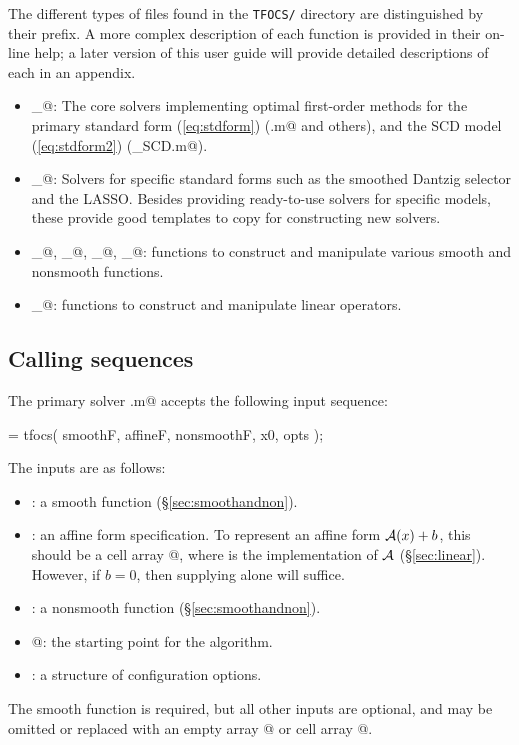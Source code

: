 \documentclass{article}
\begin{document}
The different types of files found in the \verb+TFOCS/+ directory are
distinguished by their prefix. A more complex description of each 
function is provided in their on-line help; a later version of this
user guide will provide detailed descriptions of each in an appendix.
\begin{itemize}
\item \verb@tfocs_@: The core solvers implementing optimal first-order
methods for the primary standard form (\ref{eq:stdform}) (\verb@tfocs.m@ and others),
and the SCD model (\ref{eq:stdform2}) (\verb@tfocs_SCD.m@).
\item \verb@solver_@: Solvers for specific standard forms such as the
smoothed Dantzig selector and the LASSO. Besides providing
ready-to-use solvers for specific models, these provide good templates
to copy for constructing new solvers.
\item \verb@smooth_@, \verb@prox_@, \verb@proj_@, \verb@tfunc_@: functions to construct
and manipulate various smooth and nonsmooth functions.
\item \verb@linop_@: functions to construct and manipulate linear operators.
\end{itemize}

\subsection{Calling sequences}

The primary solver \verb@tfocs.m@ accepts the following input sequence:
\begin{code}
	[ x, out ] = tfocs( smoothF, affineF, nonsmoothF, x0, opts );
\end{code}
The inputs are as follows:
\begin{itemize}
\item \verb@smoothF@: a smooth function (\S\ref{sec:smoothandnon}).
\item \verb@affineF@: an affine form specification. To represent an
affine form $\mathcal{A}(x)+b$, this should be a cell array 
@, where \verb@linearF@ is the implementation
of $\mathcal{A}$  (\S\ref{sec:linear}). However, if $b=0$, then supplying
\verb@linearF@ alone will suffice.
\item \verb@nonsmoothF@: a nonsmooth function
(\S\ref{sec:smoothandnon}).
\item {}@: the starting point for the algorithm.
\item \verb@opts@: a structure of configuration options.
\end{itemize}
The smooth function is required, but all other inputs are optional,
and may be omitted or replaced with
an empty array \verb@[]@ or cell array \verb@{}@.
\end{document}
